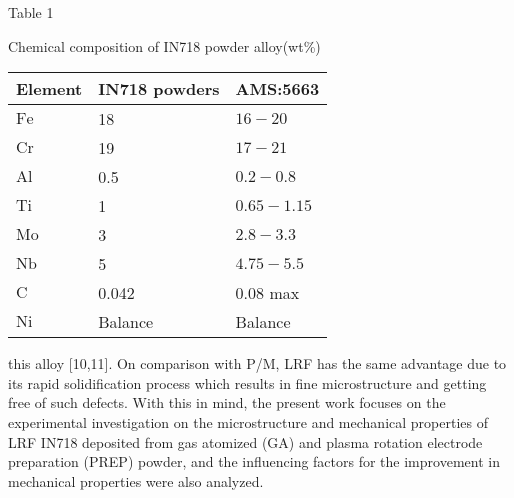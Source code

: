 \documentclass[10pt]{article}
\begin{document}
Table 1

Chemical composition of IN718 powder alloy(wt\%)

\begin{center}
\begin{tabular}{lll}
\hline
Element & IN718 powders & AMS:5663 \\
\hline
$\mathrm{Fe}$ & 18 & $16-20$ \\
$\mathrm{Cr}$ & 19 & $17-21$ \\
$\mathrm{Al}$ & 0.5 & $0.2-0.8$ \\
$\mathrm{Ti}$ & 1 & $0.65-1.15$ \\
$\mathrm{Mo}$ & 3 & $2.8-3.3$ \\
$\mathrm{Nb}$ & 5 & $4.75-5.5$ \\
$\mathrm{C}$ & 0.042 & 0.08 max \\
$\mathrm{Ni}$ & Balance & Balance \\
\hline
\end{tabular}
\end{center}

this alloy [10,11]. On comparison with P/M, LRF has the same advantage due to its rapid solidification process which results in fine microstructure and getting free of such defects. With this in mind, the present work focuses on the experimental investigation on the microstructure and mechanical properties of LRF IN718 deposited from gas atomized (GA) and plasma rotation electrode preparation (PREP) powder, and the influencing factors for the improvement in mechanical properties were also analyzed.
\end{document}
